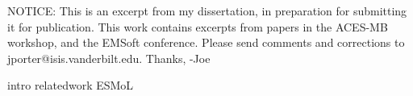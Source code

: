 \documentclass[10pt, conference, compsocconf]{IEEEtran}
\begin{document}

\ifx\techreport\undefined
\else

\fi

\ifx\techreport\undefined
\maketitle
\else
{\small NOTICE: This is an excerpt from my dissertation, in preparation for
submitting it for publication.  This work contains excerpts from papers in the ACES-MB workshop, and the EMSoft conference.  Please send comments and corrections  to jporter@isis.vanderbilt.edu. Thanks, -Joe}\\
\fi

 {intro}
 {relatedwork}
 {ESMoL}




\flushend
\end{document}
